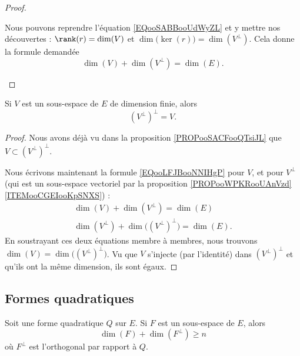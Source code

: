 \begin{proof}
\begin{subproof}
		\spitem[Conclusion]
		Nous pouvons reprendre l'équation \eqref{EQooSABBooUdWyZL} et y mettre nos découvertes : \( \rank(r)=\dim(V)\) et \( \dim\big( \ker(r) \big)=\dim(V^{\perp})\). Cela donne la formule demandée
		\begin{equation}
			\dim(V)+\dim(V^{\perp})=\dim(E).
		\end{equation}
	\end{subproof}
\end{proof}

\begin{lemma}		\label{LEMooYYGLooYIDmoa}
	Si \( V\) est un sous-espace de \( E\) de dimension finie, alors
	\begin{equation}
		(V^{\perp})^{\perp}=V.
	\end{equation}
\end{lemma}

\begin{proof}
	Nous avons déjà vu dans la proposition \ref{PROPooSACFooQTsiJL} que \( V\subset (V^{\perp})^{\perp}\).

	Nous écrivons maintenant la formule \eqref{EQooLFJBooNNIHgP} pour \( V\), et pour \( V^{\perp}\) (qui est un sous-espace vectoriel par la proposition \ref{PROPooWPKRooUAnVzd}\ref{ITEMooCGEIooKpSNXS}) :
	\begin{subequations}
		\begin{align}
			\dim(V)+\dim(V^{\perp})=\dim(E) \\
			\dim(V^{\perp})+\dim\Big((V^{\perp})^{\perp}\Big)=\dim(E).
		\end{align}
	\end{subequations}
	En soustrayant ces deux équations membre à membres, nous trouvons \( \dim(V)=\dim\Big((V^{\perp})^{\perp}\Big)\). Vu que \( V\) s'injecte (par l'identité) dans \( (V^{\perp})^{\perp}\) et qu'ils ont la même dimension, ils sont égaux.
\end{proof}


\subsection{Formes quadratiques}

\begin{lemma}     \label{LEMooOQIDooPSOeXL}
	Soit une forme quadratique \( Q\) sur \( E\). Si \( F\) est un sous-espace de \( E\), alors
	\begin{equation}
		\dim(F)+\dim(F^{\perp})\geq n
	\end{equation}
	où \( F^{\perp}\) est l'orthogonal par rapport à \( Q\).
\end{lemma}

